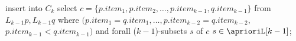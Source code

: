 insert into $C_k$
select $c = \{p.item_1,p.item_2,\ldots,p.item_{k-1},q.item_{k-1}\}$
from $L_{k-1}p,L_{k-1}q$
where  $(p.item_1 = q.item_1,\ldots,p.item_{k-2} = q.item_{k-2},$
          $p.item_{k-1} < q.item_{k-1})$
        and
          forall ($k-1$)-subsets $s$ of $c$
		        $s \in \aprioriL[k-1]$;
